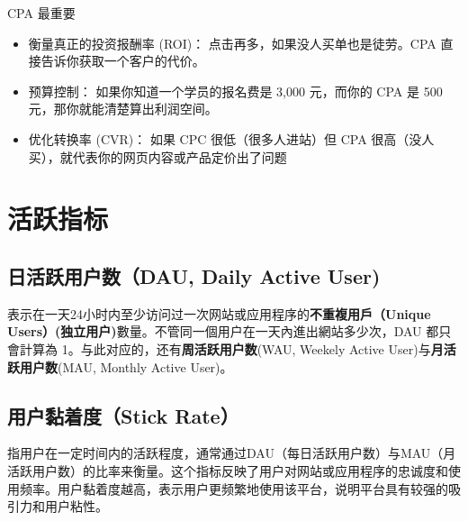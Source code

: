 \documentclass[
]{ctexart}
\begin{document}
\begin{tcolorbox}[enhanced jigsaw, arc=.35mm, bottomrule=.15mm, bottomtitle=1mm, breakable, colback=white, colbacktitle=quarto-callout-important-color!10!white, colframe=quarto-callout-important-color-frame, coltitle=black, left=2mm, leftrule=.75mm, opacityback=0, opacitybacktitle=0.6, rightrule=.15mm, title=\textcolor{quarto-callout-important-color}{\faExclamation}\hspace{0.5em}{Important}, titlerule=0mm, toprule=.15mm, toptitle=1mm]

CPA 最重要

\begin{itemize}
\item
  衡量真正的投资报酬率 (ROI)： 点击再多，如果没人买单也是徒劳。CPA
  直接告诉你获取一个客户的代价。
\item
  预算控制： 如果你知道一个学员的报名费是 3,000 元，而你的 CPA 是 500
  元，那你就能清楚算出利润空间。
\item
  优化转换率 (CVR)： 如果 CPC 很低（很多人进站）但 CPA
  很高（没人买），就代表你的网页内容或产品定价出了问题
\end{itemize}

\end{tcolorbox}

\section{活跃指标}\label{ux6d3bux8dc3ux6307ux6807}

\subsection{日活跃用户数（DAU, Daily Active
User)}\label{ux65e5ux6d3bux8dc3ux7528ux6237ux6570dau-daily-active-user}

表示在一天24小时内至少访问过一次网站或应用程序的\textbf{不重複用戶（Unique
Users）(独立用户)}數量。不管同一個用户在一天內進出網站多少次，DAU
都只會計算為 1。与此对应的，还有\textbf{周活跃用户数}(WAU, Weekely
Active User)与\textbf{月活跃用户数}(MAU, Monthly Active User)。

\subsection{用户黏着度（Stick
Rate）}\label{ux7528ux6237ux9ecfux7740ux5ea6stick-rate}

指用户在一定时间内的活跃程度，通常通过DAU（每日活跃用户数）与MAU（月活跃用户数）的比率来衡量。这个指标反映了用户对网站或应用程序的忠诚度和使用频率。用户黏着度越高，表示用户更频繁地使用该平台，说明平台具有较强的吸引力和用户粘性。
\end{document}
